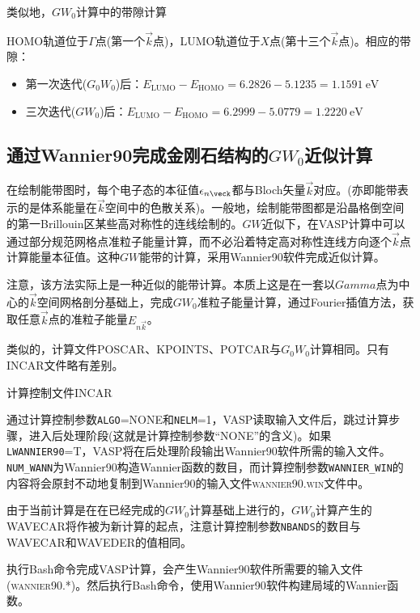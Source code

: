 类似地，$GW_0$计算中的带隙计算

\textrm{HOMO}轨道位于$\Gamma$点(第一个$\vec k$点)，\textrm{LUMO}轨道位于$X$点(第十三个$\vec k$点)。相应的带隙：
\begin{itemize}
	\item 第一次迭代($G_0W_0$)后：$E_{\mathrm{LUMO}}-E_{\mathrm{HOMO}}=6.2826-5.1235=1.1591~\mathrm{eV}$
	\item 三次迭代($GW_0$)后：$E_{\mathrm{LUMO}}-E_{\mathrm{HOMO}}=6.2999-5.0779=1.2220~\mathrm{eV}$
\end{itemize}

\subsection{通过\rm{Wannier90}完成金刚石结构的$GW_0$近似计算}
在绘制能带图时，每个电子态的本征值$\epsilon_{n\veck}$都与\textrm{Bloch}矢量$\vec k$对应。(亦即能带表示的是体系能量在$\vec k$空间中的色散关系)。一般地，绘制能带图都是沿晶格倒空间的第一\textrm{Brillouin}区某些高对称性的连线绘制的。$GW$近似下，在\textrm{VASP}计算中可以通过部分规范网格点准粒子能量计算，而不必沿着特定高对称性连线方向逐个$\vec k$点计算能量本征值。这种$GW$能带的计算，采用\textrm{Wannier90}软件完成近似计算。

注意，该方法实际上是一种近似的能带计算。本质上这是在一套以$Gamma$点为中心的$\vec k$空间网格剖分基础上，完成$GW_0$准粒子能量计算，通过\textrm{Fourier}插值方法，获取任意$\vec k$点的准粒子能量$E_{n\vec k}$。

类似的，计算文件\textrm{POSCAR}、\textrm{KPOINTS}、\textrm{POTCAR}与$G_0W_0$计算相同。只有\textrm{INCAR}文件略有差别。

计算控制文件\textrm{INCAR}

通过计算控制参数\texttt{ALGO}=\textrm{NONE}和\texttt{NELM}=1，\textrm{VASP}读取输入文件后，跳过计算步骤，进入后处理阶段(这就是计算控制参数\textrm{``NONE''}的含义)。如果\texttt{LWANNIER90}=\textrm{T}，\textrm{VASP}将在后处理阶段输出\textrm{Wannier90}软件所需的输入文件。\texttt{NUM\_WANN}为\textrm{Wannier90}构造\textrm{Wannier}函数的数目，而计算控制参数\texttt{WANNIER\_WIN}的内容将会原封不动地复制到\textrm{Wannier90}的输入文件\textsc{wannier90.win}文件中。

由于当前计算是在在已经完成的$GW_0$计算基础上进行的，$GW_0$计算产生的\textrm{WAVECAR}将作被为新计算的起点，注意计算控制参数\texttt{NBANDS}的数目与\textrm{WAVECAR}和\textrm{WAVEDER}的值相同。

执行\textrm{Bash}命令完成\textrm{VASP}计算，会产生\textrm{Wannier90}软件所需要的输入文件(\textsc{wannier90.*})。然后执行\textrm{Bash}命令，使用\textrm{Wannier90}软件构建局域的\textrm{Wannier}函数。

